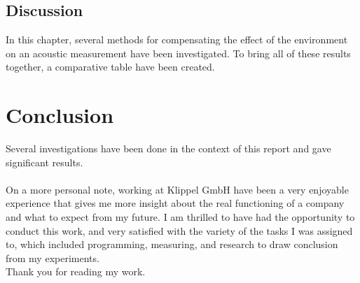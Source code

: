 \documentclass{report}
\begin{document}
\section{Discussion}

In this chapter, several methods for compensating the effect of the environment on an acoustic measurement have been  investigated. To bring all of these results together, a comparative table have been created.


\chapter*{Conclusion}

Several investigations have been done in the context of this report and gave significant results. \\~\\

On a more personal note, working at Klippel GmbH have been a very enjoyable experience that gives me more insight about the real functioning of a company and what to expect from my future. I am thrilled to have had the opportunity to conduct this work, and very satisfied with the variety of the tasks I was assigned to, which included programming, measuring, and research to draw conclusion from my experiments. \\

Thank you for reading my work.

\renewcommand{\bibname}{References}



\nocite{*}

\end{document}
